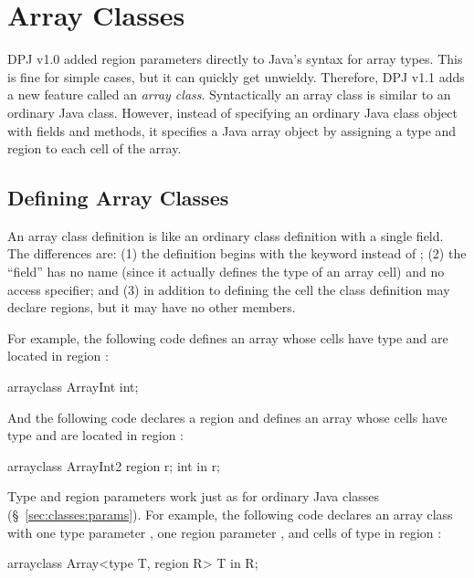 \section{Array Classes%
\label{sec:array-classes}}

DPJ v1.0 added region parameters directly to Java's syntax for array
types.  This is fine for simple cases, but it can quickly get
unwieldy.  Therefore, DPJ v1.1 adds a new feature called an
\emph{array class}.  Syntactically an array class is similar to an
ordinary Java class.  However, instead of specifying an ordinary Java
class object with fields and methods, it specifies a Java array object
by assigning a type and region to each cell of the array.

\subsection{Defining Array Classes
\label{sec:array-classes:defining}}

An array class definition is like an ordinary class definition with a
single field.  The differences are: (1) the definition begins with the
keyword  instead of ; (2) the ``field'' has
no name (since it actually defines the type of an array cell) and no
access specifier; and (3) in addition to defining the cell the class
definition may declare regions, but it may have no other members.

For example, the following code defines an array whose cells have type
 and are located in region :
%
\begin{dpjlisting}
arrayclass ArrayInt { int; }
\end{dpjlisting}
%
And the following code declares a region  and defines an array
whose cells have type  and are located in region
:
%
\begin{dpjlisting}
arrayclass ArrayInt2 {
  region r;
  int in r;
}
\end{dpjlisting}

Type and region parameters work just as for ordinary Java classes
(\S~\ref{sec:classes:params}).  For example, the following code
declares an array class with one type parameter , one region
parameter , and cells of type  in region :
%
\begin{dpjlisting}
arrayclass Array<type T, region R> {
  T in R;
}
\end{dpjlisting}

